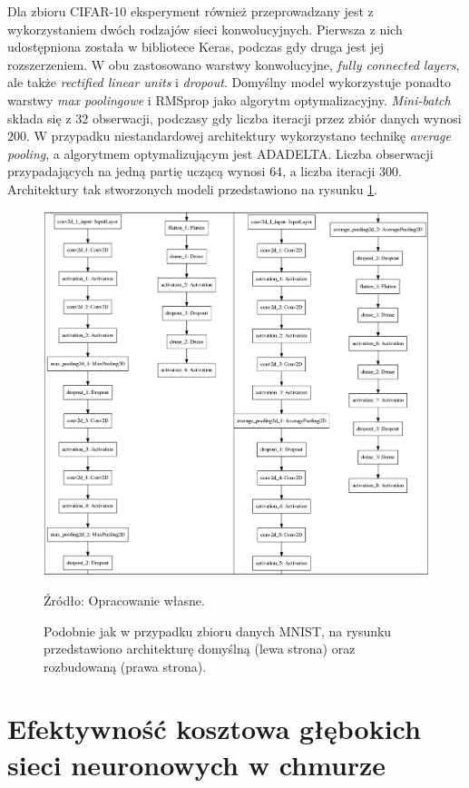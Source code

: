 \documentclass[12pt,a4paper,twoside]{article}
\newcommand{\source}[1]{\caption*{\hfill Źródło: {#1}} }
\begin{document}
Dla zbioru CIFAR-10 eksperyment również przeprowadzany jest z wykorzystaniem dwóch rodzajów sieci konwolucyjnych. Pierwsza z nich udostępniona została w bibliotece Keras, podczas gdy druga jest jej rozszerzeniem. W obu zastosowano warstwy konwolucyjne, \textit{fully connected layers}, ale także \textit{rectified linear units} i \textit{dropout}. Domyślny model wykorzystuje ponadto warstwy \textit{max poolingowe} i RMSprop jako algorytm optymalizacyjny. \textit{Mini-batch} składa się z $32$ obserwacji, podczasy gdy liczba iteracji przez zbiór danych wynosi $200$. W przypadku niestandardowej architektury wykorzystano technikę \textit{average pooling}, a algorytmem optymalizującym jest ADADELTA. Liczba obserwacji przypadających na jedną partię uczącą wynosi $64$, a liczba iteracji $300$. Architektury tak stworzonych modeli przedstawiono na rysunku \ref{fig:cifar_cnn}.
\begin{figure}[h]
  \centering
\includegraphics[scale=0.35]{../obrazy/fig:cifar_cnn.png}
\caption{Podobnie jak w przypadku zbioru danych MNIST, na rysunku przedstawiono architekturę domyślną (lewa strona) oraz rozbudowaną (prawa strona).\label{fig:cifar_cnn}}
\source{Opracowanie własne.}
\end{figure}

\clearpage

\section{Efektywność kosztowa głębokich sieci neuronowych w chmurze}
\end{document}
